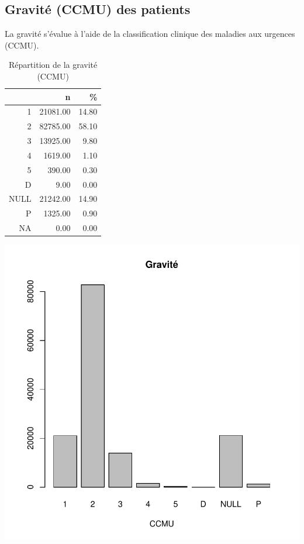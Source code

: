 \documentclass[12pt,english,french]{report}
\begin{document}
%
%
\subsection{Gravité (CCMU) des patients}

La gravité s'évalue à l'aide de la classification clinique des maladies aux urgences (CCMU).
\begin{table}[ht]
\centering
\begin{tabular}{rrr}
  \hline
 & n & \% \\ 
  \hline
1 & 21081.00 & 14.80 \\ 
  2 & 82785.00 & 58.10 \\ 
  3 & 13925.00 & 9.80 \\ 
  4 & 1619.00 & 1.10 \\ 
  5 & 390.00 & 0.30 \\ 
  D & 9.00 & 0.00 \\ 
  NULL & 21242.00 & 14.90 \\ 
  P & 1325.00 & 0.90 \\ 
  NA & 0.00 & 0.00 \\ 
   \hline
\end{tabular}
\caption{Répartition de la gravité (CCMU)} 
\label{ccmu}
\end{table}\includegraphics{rpu2012-gravite1}
\end{document}
